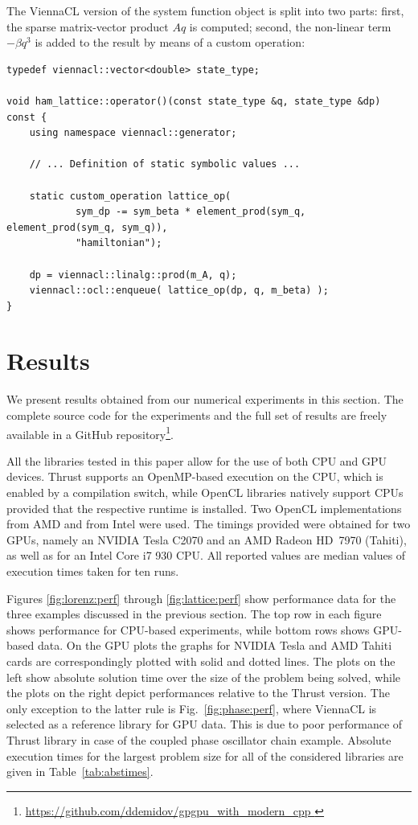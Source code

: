 \documentclass[final]{siamltex}
\newcommand{\figref}[1]{Fig.~\ref{#1}}
\begin{document}
The ViennaCL version of the system function object is split into two parts:
first, the sparse matrix-vector product $Aq$ is computed; second, the
non-linear term $-\beta q^3$ is added to the result by means of a custom
operation:
\begin{lstlisting}
typedef viennacl::vector<double> state_type;

void ham_lattice::operator()(const state_type &q, state_type &dp) const {
    using namespace viennacl::generator;

    // ... Definition of static symbolic values ...

    static custom_operation lattice_op(
            sym_dp -= sym_beta * element_prod(sym_q, element_prod(sym_q, sym_q)),
            "hamiltonian");

    dp = viennacl::linalg::prod(m_A, q);
    viennacl::ocl::enqueue( lattice_op(dp, q, m_beta) );
}
\end{lstlisting}

\section{Results} \label{sec:results}

We present results obtained from our numerical experiments in this section. The
complete source code for the experiments and the full set of results are freely
available in a GitHub repository\footnote{ \href{
https://github.com/ddemidov/gpgpu_with_modern_cpp } {
https://github.com/ddemidov/gpgpu\_with\_modern\_cpp } }.

All the libraries tested in this paper allow for the use of both CPU and GPU
devices.  Thrust supports an OpenMP-based execution on the CPU, which is
enabled by a compilation switch, while OpenCL libraries natively support CPUs
provided that the respective runtime is installed. Two OpenCL implementations
from AMD and from Intel were used.  The timings provided were obtained
for two GPUs, namely an NVIDIA Tesla C2070 and an AMD Radeon HD~7970 (Tahiti),
as well as for an Intel Core i7 930 CPU. All reported values are median values
of execution times taken for ten runs.

Figures \ref{fig:lorenz:perf} through \ref{fig:lattice:perf} show performance
data for the three examples discussed in the previous section.
The top row in each figure shows performance for CPU-based
experiments, while bottom rows shows GPU-based data. On the GPU plots the
graphs for NVIDIA Tesla and AMD Tahiti cards are correspondingly plotted with
solid and dotted lines.
The plots on the left show absolute solution time over the size of the problem
being solved, while the plots on the right depict performances relative to the
Thrust version. The only exception to the latter rule is
\figref{fig:phase:perf}, where ViennaCL is selected as a reference library for
GPU data.  This is due to poor performance of Thrust library in case of the
coupled phase oscillator chain example.
Absolute execution times for the largest problem size for all of the considered
libraries are given in Table~\ref{tab:abstimes}. 
\end{document}
